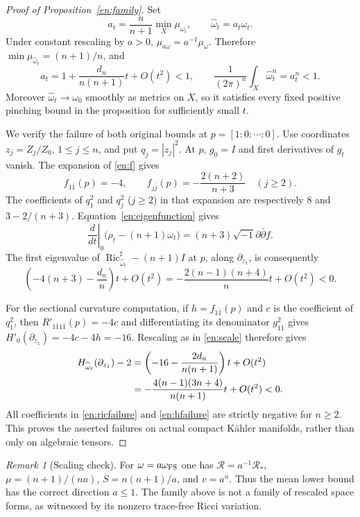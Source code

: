 \documentclass[12pt]{amsart}
\theoremstyle{definition}
\theoremstyle{remark}
\newtheorem{rem}[thm]{Remark}
\numberwithin{equation}{section}
\DeclareMathOperator{\Ric}{Ric}
\theoremstyle{plain}
\theoremstyle{remark}
\theoremstyle{definition}
\begin{document}
\begin{proof}[Proof of Proposition~\ref{en:family}]
Set
\begin{equation}\label{en:scale}
 a_t=\frac n{n+1}\min_X\mu_{\omega_t},\qquad
 \widehat\omega_t=a_t\omega_t.
\end{equation}
Under constant rescaling by $a>0$, $\mu_{a\omega}=a^{-1}\mu_\omega$.
Therefore $\min\mu_{\widehat\omega_t}=(n+1)/n$, and
\[
 a_t=1+\frac{d_n}{n(n+1)}t+O(t^2)<1,
 \qquad \frac1{(2\pi)^n}\int_X\widehat\omega_t^n=a_t^n<1.
\]
Moreover $\widehat\omega_t\to\omega_0$ smoothly as metrics on $X$,
so it satisfies every fixed positive pinching bound in the proposition
for sufficiently small $t$.

We verify the failure of both original bounds at $p=[1:0:\cdots:0]$.
Use coordinates $z_j=Z_j/Z_0$, $1\leq j\leq n$, and put
$q_j=|z_j|^2$. At $p$, $g_0=I$ and first derivatives of $g_t$ vanish.
The expansion of \eqref{en:f} gives
\[
 f_{1\bar1}(p)=-4,\qquad
 f_{j\bar j}(p)=-\frac{2(n+2)}{n+3}\quad (j\geq2).
\]
The coefficients of $q_1^2$ and $q_j^2$ ($j\geq2$) in that expansion
are respectively $8$ and $3-2/(n+3)$. Equation~\eqref{en:eigenfunction}
gives
\[
 \left.\frac d{dt}\right|_0
       \bigl(\rho_t-(n+1)\omega_t\bigr)
 =(n+3)\sqrt{-1}\partial\bar\partial f.
\]
The first eigenvalue of
$\Ric^\sharp_{\widehat\omega_t}-(n+1)I$ at $p$, along $\partial_{z_1}$,
is consequently
\begin{equation}\label{en:ricfailure}
 \left(-4(n+3)-\frac{d_n}{n}\right)t+O(t^2)
 =-\frac{2(n-1)(n+4)}n t+O(t^2)<0.
\end{equation}

For the sectional curvature computation, if $h=f_{1\bar1}(p)$ and
$c$ is the coefficient of $q_1^2$, then
$R'_{1\bar1 1\bar1}(p)=-4c$ and differentiating its denominator
$g_{1\bar1}^2$ gives $H'_0(\partial_{z_1})=-4c-4h=-16$.
Rescaling as in \eqref{en:scale} therefore gives
\begin{align}\label{en:hfailure}
 H_{\widehat\omega_t}(\partial_{z_1})-2
 &=\left(-16-\frac{2d_n}{n(n+1)}\right)t+O(t^2)\notag\\
 &=-\frac{4(n-1)(3n+4)}{n(n+1)}t+O(t^2)<0.
\end{align}
All coefficients in \eqref{en:ricfailure} and \eqref{en:hfailure} are
strictly negative for $n\geq2$. This proves the asserted failures on
actual compact K\"ahler manifolds, rather than only on algebraic tensors.
\end{proof}

\begin{rem}[Scaling check]
For $\omega=a\omega_{\rm FS}$ one has
$\mathscr R=a^{-1}\mathscr R_*$, $\mu=(n+1)/(na)$, $S=n(n+1)/a$,
and $v=a^n$. Thus the mean lower bound has the correct direction
$a\leq1$. The family above is not a family of rescaled space forms,
as witnessed by its nonzero trace-free Ricci variation.
\end{rem}
\end{document}
